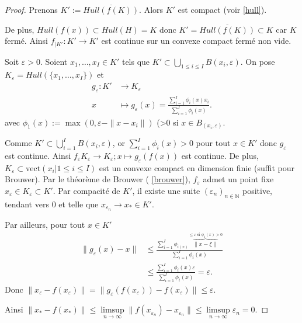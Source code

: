 \begin{proof}
	Prenons $K' := \overline{Hull\left( f\left( K \right)  \right) }$.
	Alors $K'$ est compact (voir \ref{hull}).

	De plus, $Hull\left( f(x) \right) \subset Hull\left( H \right) = K$ donc $K' = \overline{Hull\left( f\left( K \right)  \right) } \subset K$ car $K$ fermé. Ainsi $f_{|K'} : K' \to K'$ est continue sur un convexe compact fermé non vide.

	Soit $\varepsilon>0$. Soient $x_1,\ldots, x_I \in K'$ tels que $K' \subset \bigcup_{1\le i\le I} B\left( x_i, \varepsilon \right) $.
	On pose $K_{\varepsilon}= Hull\left( \{x_1,\ldots, x_I\}  \right) $ et \begin{align*}
		g_{\varepsilon}: K' &\longrightarrow K_{\varepsilon} \\
		x &\longmapsto g_{\varepsilon}(x) = \frac{ \sum_{i=1}^{I} \phi_{i}\left( x \right) x_i}{\sum_{i=1}^{I} \phi_i\left( x \right) }
	.\end{align*}
	avec $\phi_1\left( x \right) := \max\left( 0, \varepsilon - \|x-x_i\| \right) $ (>0 si $x \in  B_{(x_i, \varepsilon)}$.

	Comme $K'\subset \bigcup_{i=1} ^I B\left( x_i, \varepsilon \right) $, or $\sum_{i=1}^{I} \phi_i\left( x \right) >0$ pour tout $x \in K'$ donc $g_{\varepsilon}$ est continue. Ainsi $f_{\varepsilon} K_{\varepsilon}\to  K_{\varepsilon} ; x \mapsto g_{\varepsilon}\left( f\left( x \right)  \right) $ est continue. De plus, $K_{\varepsilon} \subset  \text{vect}\left( x_i |1\le i\le I \right) $ est un convexe compact en dimension finie (suffit pour Brouwer). Par le théorème de Brouwer ( \ref{brouwer}), $f_{\varepsilon}$ admet un point fixe $x_{\varepsilon} \in K_{\varepsilon} \subset K'$. Par compacité de $K'$, il existe une suite $\left( \varepsilon_{n} \right) _{n\in \mathbb{N}}$ positive, tendant vers $0$ et telle que $x_{\varepsilon_n} \to  x_{*} \in K'$.

	Par ailleurs, pour tout $x \in K'$ \begin{align*}
		\|g_{\varepsilon}\left( x \right) -x\| &\le \frac{\sum_{i=1}^{I} \phi_{i\left( x \right) } \overbrace{\|x-\xi\|}^{\le \varepsilon \text{ si } \phi_{1}\left( x \right) >0}}{\sum_{i=1}^{I} \phi_i\left( x \right) }\\
						       &\le \frac{ \sum_{i=1}^{I} \phi_i\left( x \right) \varepsilon}{\sum_{i=1}^{I} \phi_i\left( x \right) } =\varepsilon
	.\end{align*}
	Donc $\|x_{\varepsilon}- f\left( x_{\varepsilon} \right) \| = \| g_{\varepsilon}\left( f\left( x_{\varepsilon} \right)  \right) - f\left( x_{\varepsilon} \right) \| \le \varepsilon$.

	Ainsi $\|x_{*} - f\left( x_* \right) \| \le \limsup \limits_{n\to \infty } \| f\left( x_{ \varepsilon_n} \right) - x_{\varepsilon_n}\| \le \limsup \limits_{n\to \infty} \varepsilon_n = 0$.
\end{proof}

